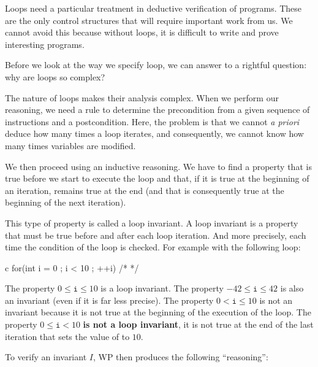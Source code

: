 Loops need a particular treatment in deductive verification of
programs. These are the only control structures that will require
important work from us. We cannot avoid this because without loops, it
is difficult to write and prove interesting programs.



Before we look at the way we specify loop, we can answer to a rightful
question: why are loops so complex?



\label{l3:statements-loops-invariant}


The nature of loops makes their analysis complex. When we perform our
reasoning, we need a rule to determine the precondition from a given sequence
of instructions and a postcondition. Here, the problem is that we cannot
\emph{a priori} deduce how many times a loop iterates, and consequently, we
cannot know how many times variables are modified.



We then proceed using an inductive reasoning. We have to find a
property that is true before we start to execute the loop and that, if
it is true at the beginning of an iteration, remains true at the end
(and that is consequently true at the beginning of the next iteration).



This type of property is called a loop invariant. A loop invariant is a
property that must be true before and after each loop iteration. And more
precisely, each time the condition of the loop is checked. For example with
the following loop:



\begin{CodeBlock}{c}
for(int i = 0 ; i < 10 ; ++i){ /* */ }
\end{CodeBlock}



The property $0 \leq \texttt{i} \leq 10$ is a loop invariant. The property
$-42 \leq \texttt{i} \leq 42$ is also an invariant (even if it is far less
precise). The property $0 < \texttt{i} \leq 10$ is not an invariant because it is
not true at the beginning of the execution of the loop. The property
$0 \leq \texttt{i} < 10$ \textbf{is not a loop invariant}, it is not true at the
end of the last iteration that sets the value of  to $10$.

To verify an invariant $I$, WP then produces the following
``reasoning'':

